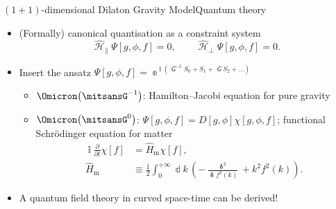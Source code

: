 \documentclass{beamer}
\newcommand{\ii}{{\Bbbi}}
\newcommand{\ee}{{\Bbbe}}
\newcommand{\rbr}[1]{{\left(#1\right)}}
\newcommand{\rfun}[2]{{#1}\mathopen{}\left(#2\right)\mathclose{}}
\newcommand{\sfun}[2]{{#1}\mathopen{}\left[#2\right]\mathclose{}}
\newcommand{\dd}{\Bbbd}
\newcommand{\frpa}[2]{{\frac{\partial{#1}}{\partial{#2}}}}
\newcommand{\what}[1]{{\widehat{#1}}}
\newcommand{\nG}{\mitsansG} %
\begin{document}
\begin{frame}[allowframebreaks]{$\rbr{1+1}$-dimensional Dilaton Gravity 
Model}{Quantum theory \cite{Demers1996}}

\begin{itemize}
\item (Formally) canonical quantisation as a constraint system
\begin{equation}
 \what{\mscrH}_\parallel \sfun{\Psi}{g,\phi,f} = 0, \qquad
 \what{\mscrH}_\perp  \sfun{\Psi}{g,\phi,f} = 0.
\end{equation}




\item Insert the ansatz $\sfun{\Psi}{g,\phi,f} = \ee^{\ii\rbr{\nG^{-1}S_0 + 
S_1 + \nG S_2 + \ldots}}$

\begin{itemize}
\item $\rfun{\Omicron}{\nG^{-1}}$: Hamilton--Jacobi equation for pure gravity
\item $\rfun{\Omicron}{\nG^0}$: $\sfun{\Psi}{g,\phi,f} = \sfun{D}{g, \phi}
\sfun{\chi}{g, \phi, f}$; functional \alert{Schrödinger equation for matter}
\begin{align}
\ii \frpa{}{t}\sfun{\chi}{f} &= \what{H}_\text{m} \sfun{\chi}{f},
\label{eq:functional-sch} \\
\what{H}_\text{m} &\equiv \frac{1}{2}\int_{0}^{+\infty} \dd k\,
\rbr{-\frac{\mbfdelta^2}{\mbfdelta \rfun{f^2}{k}} + k^2 \rfun{f^2}{k}}.
\end{align}
\end{itemize}
\item A quantum field theory in curved space-time can be derived!


\end{itemize}
\end{frame}
\end{document}
